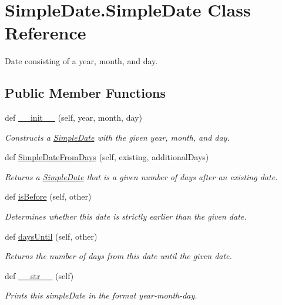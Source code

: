 \hypertarget{classSimpleDate_1_1SimpleDate}{}\section{Simple\+Date.\+Simple\+Date Class Reference}
\label{classSimpleDate_1_1SimpleDate}


Date consisting of a year, month, and day.  


\subsection*{Public Member Functions}
\begin{DoxyCompactItemize}
\item 
def \hyperlink{classSimpleDate_1_1SimpleDate_a8e01278f5e3987e64396ef345ccb7dde}{\+\_\+\+\_\+init\+\_\+\+\_\+} (self, year, month, day)
\begin{DoxyCompactList}\small\item\em Constructs a \hyperlink{classSimpleDate_1_1SimpleDate}{Simple\+Date} with the given year, month, and day. \end{DoxyCompactList}\item 
def \hyperlink{classSimpleDate_1_1SimpleDate_a84c11740813035133e89c4f55d35268d}{Simple\+Date\+From\+Days} (self, existing, additional\+Days)
\begin{DoxyCompactList}\small\item\em Returns a \hyperlink{classSimpleDate_1_1SimpleDate}{Simple\+Date} that is a given number of days after an existing date. \end{DoxyCompactList}\item 
def \hyperlink{classSimpleDate_1_1SimpleDate_a3f991d5bf914be8175808732a37296c4}{is\+Before} (self, other)
\begin{DoxyCompactList}\small\item\em Determines whether this date is strictly earlier than the given date. \end{DoxyCompactList}\item 
def \hyperlink{classSimpleDate_1_1SimpleDate_a9e6a7a4fa0751c99c28dc7130c849944}{days\+Until} (self, other)
\begin{DoxyCompactList}\small\item\em Returns the number of days from this date until the given date. \end{DoxyCompactList}\item 
def \hyperlink{classSimpleDate_1_1SimpleDate_ad33dd54a78befede77ffed77c85d6861}{\+\_\+\+\_\+str\+\_\+\+\_\+} (self)
\begin{DoxyCompactList}\small\item\em Prints this simple\+Date in the format year-\/month-\/day. \end{DoxyCompactList}\end{DoxyCompactItemize}
